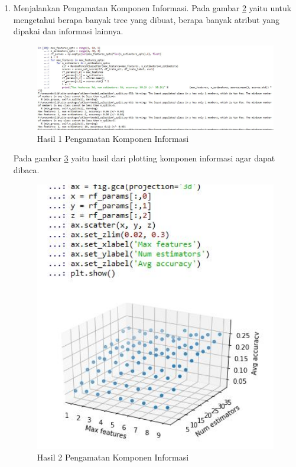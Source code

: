 \begin{enumerate}
\begin{figure}[!htbp]
	\caption{Hasil 3 Cross Validation}
	\label{h35}
\end{figure}
\item Menjalankan Pengamatan Komponen Informasi.
\subitem Pada gambar \ref{h36} yaitu untuk mengetahui berapa banyak tree yang dibuat, berapa banyak atribut yang dipakai dan informasi lainnya.
\begin{figure}[!htbp]
	\centerline{\includegraphics[width=1\textwidth]{figures/huda/chapter3_praktek/32.JPG}}
	\caption{Hasil 1 Pengamatan Komponen Informasi}
	\label{h36}
\end{figure}
\subitem Pada gambar \ref{h37} yaitu hasil dari plotting komponen informasi agar dapat dibaca.
\begin{figure}[!htbp]
	\centerline{\includegraphics[width=1\textwidth]{figures/huda/chapter3_praktek/33.JPG}}
	\caption{Hasil 2 Pengamatan Komponen Informasi}
	\label{h37}
\end{figure}
\end{enumerate}

